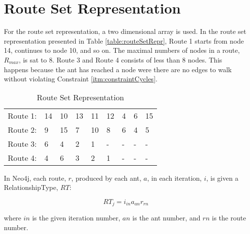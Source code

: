 \section{Route Set Representation}
For the route set representation, a two dimensional array is used. In the route set representation presented in Table \vref{table:routeSetRepr}, Route 1 starts from node 14, continues to node 10, and so on. The maximal numbers of nodes in a route, $R_{max}$, is sat to 8. Route 3 and Route 4 consists of less than 8 nodes. This happens because the ant has reached a node were there are no edges to walk without violating Constraint \vref{itm:constraintCycles}.
\begin{table}[H]
    \begin{center}
        \begin{tabular}{|l| l l l l l l l l|}
      \hline
        Route 1: & 14 & 10 & 13 & 11 & 12 & 4 & 6 & 15 \\
        Route 2: & 9 & 15 & 7 & 10 & 8 & 6 & 4 & 5 \\
        Route 3: & 6 & 4 & 2 & 1 & - & - & - & - \\
        Route 4: & 4 & 6 & 3 & 2 & 1 & - & - & - \\
      \hline
        \end{tabular}
    \end{center}
    \caption {Route Set Representation}
    \label{table:routeSetRepr}
\end{table}

In Neo4j, each route, $r$, produced by each ant, $a$, in each iteration, $i$, is given a RelationshipType, $RT$:

$$RT_j = i_{in}a_{an}r_{rn}$$

where $in$ is the given iteration number, $an$ is the ant number, and $rn$ is the route number.
